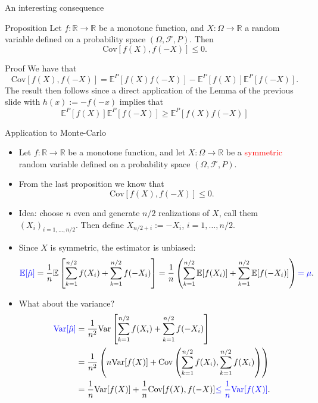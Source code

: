 \documentclass[9 pt]{beamer} %
\def \blue {\textcolor{blue}}
\def \red {\textcolor{red}}
\def \F {\mathcal{F}}
\def \bE {\mathbb{E}}
\begin{document}
\begin{frame}{An interesting consequence}
\begin{block}{Proposition}
Let $f: \mathbb{R} \to \mathbb{R}$ be a monotone function, and $X: \Omega \to \mathbb{R}$ a random variable defined on a probability space $(\Omega, \F, P)$.
Then
$$
\text{Cov}[f(X),f(-X)] \le 0.
$$
\end{block}
\begin{block}{Proof}
We have that 
$$
\text{Cov}[f(X),f(-X)] = \bE^P[f(X)f(-X)]-\bE^P[f(X)]\bE^P[f(-X)].
$$
The result then follows since a direct application of the Lemma of the previous slide with $h(x):=-f(-x)$ implies that
$$
\bE^P[f(X)]\bE^P[f(-X)] \ge \bE^P[f(X)f(-X)]
$$ 
\end{block}
\end{frame}


\begin{frame}{Application to Monte-Carlo}
\small{
\begin{itemize}
\item Let $f: \mathbb{R} \to \mathbb{R}$ be a monotone function, and let $X: \Omega \to \mathbb{R}$ be a \red{symmetric} random variable defined on a probability space $(\Omega, \F, P)$.
\item From the last proposition we know that
$$
\text{Cov}[f(X),f(-X)] \le 0.
$$
\item Idea: choose $n$ even and generate $n/2$ realizations of $X$, call them $(X_i)_{i=1,\dots,n/2}$. Then define $X_{n/2+i}:=-X_i$,  $i=1,\dots,n/2$.
\item Since $X$ is symmetric, the estimator is unbiased:
$$
\blue{\bE[\hat \mu] }=  \frac{1}{n}  \bE\left[\sum_{k=1}^{n/2} f(X_i) + \sum_{k=1}^{n/2} f(-X_i)\right] = \frac{1}{n}\left( \sum_{k=1}^{n/2} \bE[f(X_i)] +\sum_{k=1}^{n/2} \bE[f(-X_i)] \right) \blue{= \mu}.
$$
\item What about the variance?
\begin{align}
\blue{\text{Var}[\hat \mu]} &= \frac{1}{n^2}\text{Var}\left[\sum_{k=1}^{n/2} f(X_i) + \sum_{k=1}^{n/2} f(-X_i)\right] \notag \\ &=  \frac{1}{n^2}\left(n \text{Var} [f(X)] + \text{Cov}\left(\sum_{k=1}^{n/2} f(X_i),\sum_{k=1}^{n/2} f(X_i)\right) \right) \notag \\
&=\frac{1}{n}\text{Var} [f(X)] +  \frac{1}{n}\text{Cov} [f(X),f(-X)] \blue{\le \frac{1}{n}\text{Var} [f(X)]}.  \notag 
\end{align}
\end{itemize}}
\end{frame}
\end{document}

